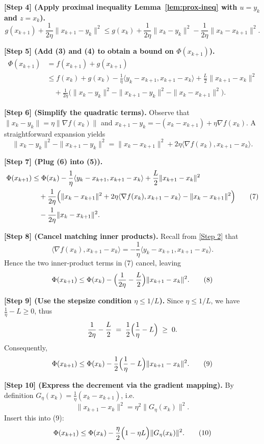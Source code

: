 \documentclass{article}
\newcommand{\grad}{\nabla}
\begin{document}
\noindent\textbf{[Step 4] (Apply proximal inequality Lemma~\ref{lem:prox-ineq} with $u=y_k$ and $z=x_k$).}
\[
g(x_{k+1})+\frac{1}{2\eta}\|x_{k+1}-y_k\|^{2}
\le g(x_k)+\frac{1}{2\eta}\|x_k-y_k\|^{2}
-\frac{1}{2\eta}\|x_k-x_{k+1}\|^{2}.
\tag{4}
\]

\noindent\textbf{[Step 5] (Add (3) and (4) to obtain a bound on $\Phi(x_{k+1})$).}
\[
\begin{aligned}
\Phi(x_{k+1}) 
&= f(x_{k+1})+g(x_{k+1}) \\
&\le f(x_k)+g(x_k)
-\frac{1}{\eta}\langle y_k-x_{k+1}, x_{k+1}-x_k\rangle
+\frac{L}{2}\|x_{k+1}-x_k\|^{2}\\
&\quad+\frac{1}{2\eta}\bigl(\|x_k-y_k\|^{2}-\|x_{k+1}-y_k\|^{2}-\|x_k-x_{k+1}\|^{2}\bigr).
\end{aligned}
\tag{5}
\]

\noindent\textbf{[Step 6] (Simplify the quadratic terms).}
Observe that $\|x_k-y_k\|=\eta\|\grad f(x_k)\|$ and $x_{k+1}-y_k = -(x_k-x_{k+1})+\eta\grad f(x_k)$. A straightforward expansion yields
\[
\|x_k-y_k\|^{2}-\|x_{k+1}-y_k\|^{2}
= \|x_k-x_{k+1}\|^{2}+2\eta\langle\grad f(x_k),x_{k+1}-x_k\rangle.
\tag{6}
\]

\noindent\textbf{[Step 7] (Plug (6) into (5)).}
\[
\begin{aligned}
\Phi(x_{k+1})
&\le \Phi(x_k)
-\frac{1}{\eta}\langle y_k-x_{k+1}, x_{k+1}-x_k\rangle
+\frac{L}{2}\|x_{k+1}-x_k\|^{2}\\
&\quad+\frac{1}{2\eta}\Bigl(\|x_k-x_{k+1}\|^{2}+2\eta\langle\grad f(x_k),x_{k+1}-x_k\rangle-\|x_k-x_{k+1}\|^{2}\Bigr)\\
&\quad-\frac{1}{2\eta}\|x_k-x_{k+1}\|^{2}.
\end{aligned}
\tag{7}
\]

\noindent\textbf{[Step 8] (Cancel matching inner products).}
Recall from \eqref{Step 2} that
\[
\langle\grad f(x_k),x_{k+1}-x_k\rangle
= -\frac{1}{\eta}\langle y_k-x_{k+1}, x_{k+1}-x_k\rangle.
\]
Hence the two inner‑product terms in (7) cancel, leaving
\[
\Phi(x_{k+1})\le \Phi(x_k)-\Bigl(\frac{1}{2\eta}-\frac{L}{2}\Bigr)\|x_{k+1}-x_k\|^{2}.
\tag{8}
\]

\noindent\textbf{[Step 9] (Use the stepsize condition $\eta\le 1/L$).}
Since $\eta\le 1/L$, we have $\frac{1}{\eta}-L\ge0$, thus
\[
\frac{1}{2\eta}-\frac{L}{2}\;=\;\frac{1}{2}\Bigl(\frac{1}{\eta}-L\Bigr)\;\ge\;0.
\]
Consequently,
\[
\Phi(x_{k+1})\le \Phi(x_k)-\frac{1}{2}\Bigl(\frac{1}{\eta}-L\Bigr)\|x_{k+1}-x_k\|^{2}.
\tag{9}
\]

\noindent\textbf{[Step 10] (Express the decrement via the gradient mapping).}
By definition $G_{\eta}(x_k)=\frac{1}{\eta}(x_k-x_{k+1})$, i.e.
\[
\|x_{k+1}-x_k\|^{2}= \eta^{2}\|G_{\eta}(x_k)\|^{2}.
\]
Insert this into (9):
\[
\Phi(x_{k+1})\le \Phi(x_k)-\frac{\eta}{2}\Bigl(1-\eta L\Bigr)\|G_{\eta}(x_k)\|^{2}.
\tag{10}
\]
\end{document}
